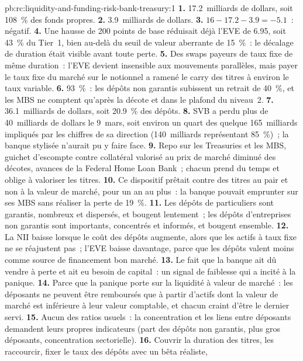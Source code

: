 \begin{solution}{pb:rc:liquidity-and-funding-risk-bank-treasury:1}
\textbf{1.} 17.2~milliards de dollars, soit 108~\% des fonds propres.
\textbf{2.} 3.9~milliards de dollars.
\textbf{3.} $16-17.2-3.9 = -5.1$~: négatif.
\textbf{4.} Une hausse de 200 points de base réduisait déjà l'EVE de 6.95, soit 43~\% du Tier~1, bien au-delà du seuil
de valeur aberrante de 15~\%~: le décalage de duration était visible avant toute perte.
\textbf{5.} Des swaps payeurs de taux fixe de même duration~: l'EVE devient insensible aux mouvements parallèles, mais payer le taux fixe
du marché sur le notionnel a ramené le carry des titres à environ le taux variable.
\textbf{6.} 93~\%~: les dépôts non garantis subissent un retrait de 40~\%, et les MBS ne comptent qu'après la décote
et dans le plafond du niveau~2.
\textbf{7.} 36.1~milliards de dollars, soit 20.9~\% des dépôts.
\textbf{8.} SVB a perdu plus de 40~milliards de dollars le 9~mars, soit environ un quart des quelque 165~milliards
impliqués par les chiffres de sa direction (140~milliards représentant 85~\%)~; la banque stylisée n'aurait pu y faire face.
\textbf{9.} Repo sur les Treasuries et les MBS, guichet d'escompte contre collatéral valorisé au prix de marché diminué des
décotes, avances de la Federal Home Loan Bank~; chacun prend du temps et oblige à valoriser les titres.
\textbf{10.} Ce dispositif prêtait contre des titres au pair et non à la valeur de marché, pour un an au plus~: la banque pouvait emprunter
sur ses MBS sans réaliser la perte de 19~\%.
\textbf{11.} Les dépôts de particuliers sont garantis, nombreux et dispersés, et bougent lentement~; les dépôts d'entreprises non garantis
sont importants, concentrés et informés, et bougent ensemble.
\textbf{12.} La NII baisse lorsque le coût des dépôts augmente, alors que les actifs à taux fixe ne se réajustent pas~; l'EVE baisse
davantage, parce que les dépôts valent moins comme source de financement bon marché.
\textbf{13.} Le fait que la banque ait dû vendre à perte et ait eu besoin de capital~: un signal de faiblesse qui a incité
à la panique.
\textbf{14.} Parce que la panique porte sur la liquidité à valeur de marché~: les déposants ne peuvent être remboursés que
à partir d'actifs dont la valeur de marché est inférieure à leur valeur comptable, et chacun craint d'être le dernier servi.
\textbf{15.} Aucun des ratios usuels~: la concentration et les liens entre déposants demandent leurs propres
indicateurs (part des dépôts non garantis, plus gros déposants, concentration sectorielle).
\textbf{16.} Couvrir la duration des titres, les raccourcir, fixer le taux des dépôts avec un bêta réaliste,

\end{solution}
